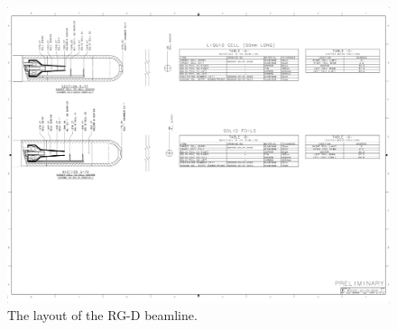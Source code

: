 \documentclass[11pt]{article}
\begin{document}
\begin{figure}[hbt]
\vspace{-2cm}
\begin{center}
\includegraphics[width=9in,angle=90]{RGD_beamline_p5.pdf}
\end{center}
\caption{ \label{fig:beamline5} 
The layout of the RG-D beamline. }
\end{figure}
\end{document}

